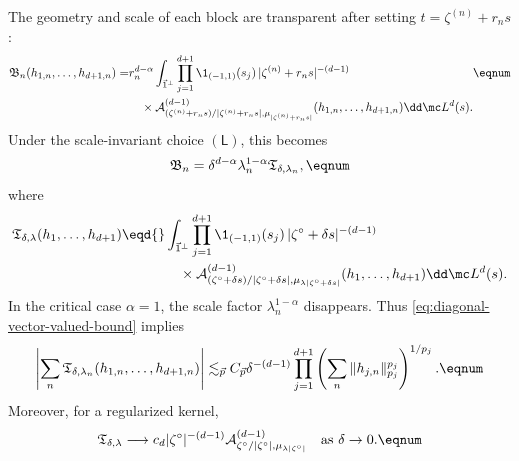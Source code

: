 The geometry and scale of each block are transparent after setting
\(t=\zeta^{(n)}+r_ns\):
\[
\begin{aligned}[t]
  \mathfrak B_n(h_{1,n},\ldots,h_{d+1,n})
  =&r_n^{d-\alpha}
  \int_{\vec1^\perp}
  \prod_{j=1}^{d+1}\1_{(-1,1)}(s_j)\,
  |\zeta^{(n)}+r_ns|^{-(d-1)}\\
  &\quad\times
  \mathcal A_{
    (\zeta^{(n)}+r_ns)/|\zeta^{(n)}+r_ns|,
    \mu_{|\zeta^{(n)}+r_ns|}
  }^{(d-1)}
  (h_{1,n},\ldots,h_{d+1,n})
  \dd\mc L^d(s).
\end{aligned}
\eqnum \label{eq:diagonal-block-polar-form}
\]
Under the scale-invariant choice \((\mathsf L)\), this becomes
\[
  \mathfrak B_n
  =\delta^{d-\alpha}\lambda_n^{1-\alpha}
  \mathfrak T_{\delta,\lambda_n},
  \eqnum \label{eq:diagonal-block-scaling}
\]
where
\[
\begin{aligned}
  \mathfrak T_{\delta,\lambda}(h_1,\ldots,h_{d+1})
  \eqd{}&
  \int_{\vec1^\perp}
  \prod_{j=1}^{d+1}\1_{(-1,1)}(s_j)\,
  |\zeta^\circ+\delta s|^{-(d-1)}\\
  &\quad\times
  \mathcal A_{
    (\zeta^\circ+\delta s)/|\zeta^\circ+\delta s|,
    \mu_{\lambda|\zeta^\circ+\delta s|}
  }^{(d-1)}
  (h_1,\ldots,h_{d+1})
  \dd\mc L^d(s).
\end{aligned}
\]
In the critical case \(\alpha=1\), the scale factor
\(\lambda_n^{1-\alpha}\) disappears.  Thus \eqref{eq:diagonal-vector-valued-bound} implies
\[
  \left|
  \sum_n\mathfrak T_{\delta,\lambda_n}
  (h_{1,n},\ldots,h_{d+1,n})
  \right|
  \lesssim_{\vec p}
  C_{\vec p}\delta^{-(d-1)}
  \prod_{j=1}^{d+1}
  \left(
    \sum_n\|h_{j,n}\|_{p_j}^{p_j}
  \right)^{1/p_j}.
  \eqnum \label{eq:translation-vector-valued-bound}
\]
Moreover, for a regularized kernel,
\[
  \mathfrak T_{\delta,\lambda}
  \longrightarrow
  c_d|\zeta^\circ|^{-(d-1)}
  \mathcal A_{
    \zeta^\circ/|\zeta^\circ|,
    \mu_{\lambda|\zeta^\circ|}
  }^{(d-1)}
  \quad\text{as }\delta\to0.
  \eqnum \label{eq:block-operator-pointwise-limit}
\]

